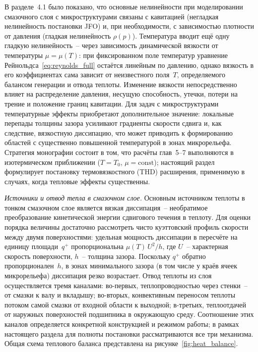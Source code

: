 В разделе~4.1 было показано, что основные нелинейности при
моделировании смазочного слоя с микроструктурами связаны
с кавитацией (негладкая нелинейность постановки JFO)
и, при необходимости, с зависимостью плотности от
давления (гладкая нелинейность $\rho(p)$). Температура
вводит ещё одну гладкую нелинейность~-- через зависимость
динамической вязкости от температуры $\mu = \mu(T)$:
при фиксированном поле температур уравнение
Рейнольдса~\eqref{eq:reynolds_full} остаётся линейным
по давлению, однако вязкость в его коэффициентах сама
зависит от неизвестного поля~$T$, определяемого балансом
генерации и отвода теплоты. Изменение вязкости
непосредственно влияет на распределение давления, несущую
способность, утечки, потери на трение и положение границ
кавитации. Для задач с микроструктурами температурные
эффекты приобретают дополнительное значение: локальные
перепады толщины зазора усиливают градиенты скорости сдвига
и, как следствие, вязкостную диссипацию, что может приводить
к формированию областей с существенно повышенной
температурой в зонах микрорельефа. Стратегия монографии
состоит в том, что расчёты глав~5--7 выполняются
в изотермическом приближении ($T = T_0$, $\mu = \mathrm{const}$);
настоящий раздел формулирует постановку термовязкостного
(THD) расширения, применимую в случаях, когда тепловые
эффекты существенны.

\textit{Источники и отвод тепла в смазочном слое.}
Основным источником теплоты в тонком смазочном слое является
вязкая диссипация~-- необратимое преобразование кинетической
энергии сдвигового течения в теплоту. Для оценки порядка
величины достаточно рассмотреть чисто куэттовский профиль
скорости между двумя поверхностями: удельная мощность
диссипации в пересчёте на единицу площади~$q^{+}$ пропорциональна $\mu(T)\,U^2/h$, где
$U$~-- характерная скорость поверхности, $h$~-- толщина
зазора. Поскольку $q^{+}$ обратно пропорционален~$h$,
в зонах минимального зазора (в том числе у краёв ячеек
микрорельефа) диссипация резко возрастает. Отвод теплоты
из слоя осуществляется тремя каналами: во-первых,
теплопроводностью через стенки~-- от смазки к валу
и вкладышу; во-вторых, конвективным переносом теплоты
потоком самой смазки от входной области к выходной;
в-третьих, теплоотдачей от наружных поверхностей подшипника
в окружающую среду. Соотношение этих каналов определяется
конкретной конструкцией и режимом работы; в рамках
настоящего раздела для полноты постановки рассматриваются
все три механизма. Общая схема теплового баланса
представлена на рисунке~\ref{fig:heat_balance}.

